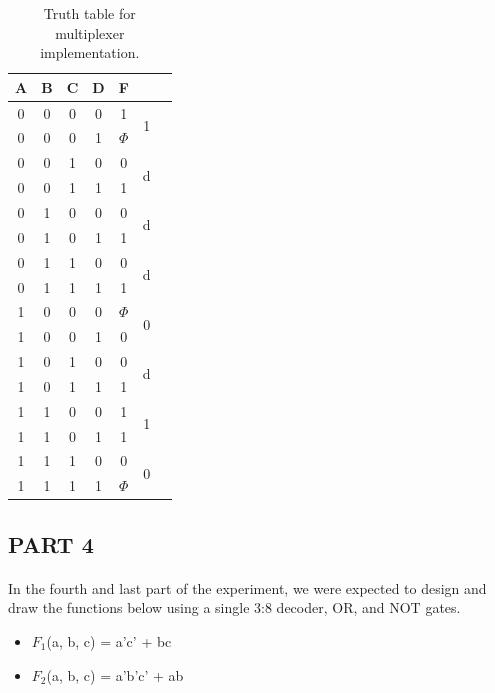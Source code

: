 \documentclass[pdftex,12pt,a4paper]{article}
\begin{document}
\begin{table}
\centering
    \begin{tabular}{|c|c|c|c|c|c|c|}
    \hline
         A & B & C & D & F &     \\ \hline
         0 & 0 & 0 & 0 & 1 & \multirow{2}{1em}{1} \\
         0 & 0 & 0 & 1 & ${\Phi}$ & \\\hline
         0 & 0 & 1 & 0 & 0 & \multirow{2}{1em}{d}\\
         0 & 0 & 1 & 1 & 1 & \\\hline
         0 & 1 & 0 & 0 & 0 & \multirow{2}{1em}{d}\\
         0 & 1 & 0 & 1 & 1 & \\\hline
         0 & 1 & 1 & 0 & 0 & \multirow{2}{1em}{d}\\
         0 & 1 & 1 & 1 & 1 & \\\hline
         1 & 0 & 0 & 0 & ${\Phi}$ & \multirow{2}{1em}{0} \\
         1 & 0 & 0 & 1 & 0 & \\\hline
         1 & 0 & 1 & 0 & 0 & \multirow{2}{1em}{d}\\
         1 & 0 & 1 & 1 & 1 & \\\hline
         1 & 1 & 0 & 0 & 1 & \multirow{2}{1em}{1}\\
         1 & 1 & 0 & 1 & 1 & \\\hline
         1 & 1 & 1 & 0 & 0 & \multirow{2}{1em}{0}\\
         1 & 1 & 1 & 1 & ${\Phi}$ & \\
         \hline
    \end{tabular}
    \caption{Truth table for multiplexer implementation.}
    \label{truth2}
\end{table}


\clearpage
\subsection{PART 4}

\paragraph{}
In the fourth and last part of the experiment, we were expected to design and draw the functions below using a single 3:8 decoder, OR, and NOT gates.

\begin{itemize}
    \item $F_{1}$(a, b, c) = a'c' + bc
    \item $F_{2}$(a, b, c) = a'b'c' + ab
\end{itemize}
\end{document}
